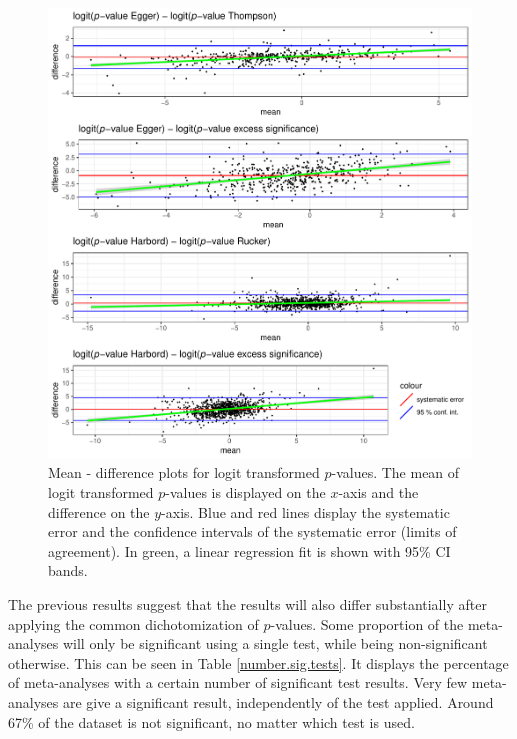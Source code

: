\documentclass[11pt,a4paper,twoside]{book}\usepackage[]{graphicx}\usepackage[]{color}
\newenvironment{knitrout}{}{} %
\begin{document}
\begin{figure}
\begin{knitrout}
\color{fgcolor}

{\centering \includegraphics[width=\textwidth-3cm]{figure/ch03_figunnamed-chunk-15-1} 

}



\end{knitrout}
\caption{Mean - difference plots for logit transformed $p$-values. The mean of logit transformed $p$-values is displayed on the $x$-axis and the difference on the $y$-axis. Blue and red lines display the systematic error and the confidence intervals of the systematic error (limits of agreement).
In green, a linear regression fit is shown with 95\% CI bands.}
\label{fig:mean.diff.test}
\end{figure}

The previous results suggest that the results will also differ substantially after applying the common dichotomization of $p$-values. Some proportion of the meta-analyses will only be significant using a single test, while being non-significant otherwise. This can be seen in Table \ref{number.sig.tests}. It displays the percentage of meta-analyses with a certain number of significant test results. Very few meta-analyses are give a significant result, independently of the test applied. Around 67\% of the dataset is not significant, no matter which test is used. \\
\end{document}
